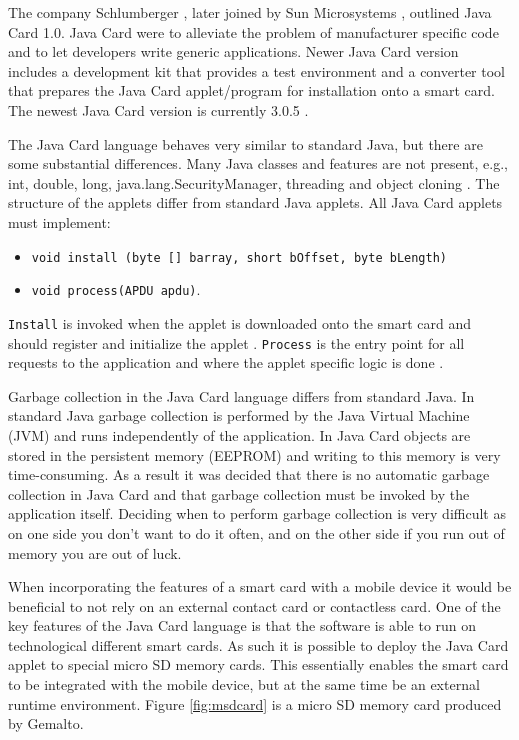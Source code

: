 The company Schlumberger \cite{schlumberger}, later joined by Sun Microsystems \cite{sunMicroSystems}, outlined Java Card 1.0. Java Card were to alleviate the problem of manufacturer specific code and to let developers write generic applications. Newer Java Card version includes a development kit that provides a test environment and a converter tool that prepares the Java Card applet/program for installation onto a smart card. The newest Java Card version is currently 3.0.5 \cite{javacard305}.

The Java Card language behaves very similar to standard Java, but there are some substantial differences. Many Java classes and features are not present, e.g., int, double, long, java.lang.SecurityManager, threading and object cloning \cite{javacardlimits}. The structure of the applets differ from standard Java applets. All Java Card applets must implement:
\begin{itemize}
    \item \texttt{void install (byte [] barray, short bOffset, byte bLength)}
    \item \texttt{void process(APDU apdu)}.
\end{itemize}
\texttt{Install} is invoked when the applet is downloaded onto the smart card and should register and initialize the applet \cite{javacardinstall}. \texttt{Process} is the entry point for all requests to the application and where the applet specific logic is done \cite{javacardprocess}.

Garbage collection in the Java Card language differs from standard Java. In standard Java garbage collection is performed by the Java Virtual Machine (JVM) and runs independently of the application. In Java Card objects are stored in the persistent memory (EEPROM) and writing to this memory is very time-consuming. As a result it was decided that there is no automatic garbage collection in Java Card and that garbage collection must be invoked by the application itself. Deciding when to perform garbage collection is very difficult as on one side you don't want to do it often, and on the other side if you run out of memory you are out of luck.

When incorporating the features of a smart card with a mobile device it would be beneficial to not rely on an external contact card or contactless card. One of the key features of the Java Card language is that the software is able to run on technological different smart cards. As such it is possible to deploy the Java Card applet to special micro SD memory cards. This essentially enables the smart card to be integrated with the mobile device, but at the same time be an external runtime environment. Figure \ref{fig:msdcard} is a micro SD memory card produced by Gemalto.

